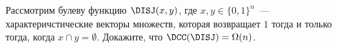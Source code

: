Рассмотрим булеву функцию $\DISJ(x, y)$, где $x, y \in \{0, 1\}^n$~--- характеричстические векторы
множеств, которая возвращает $1$ тогда и только тогда, когда $x \cap y = \emptyset$. Докажите, что
$\DCC(\DISJ) = \Omega(n)$.